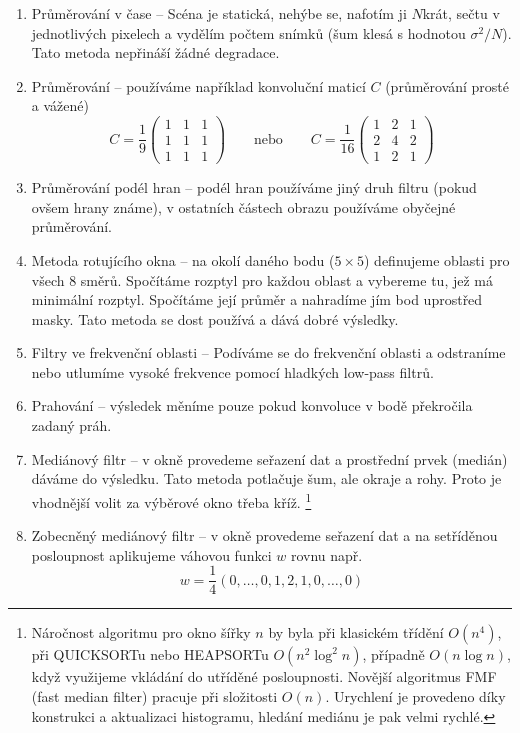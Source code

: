 \begin{enumerate}
\item Průměrování v čase -- Scéna je statická, nehýbe se, nafotím ji $ N $krát, sečtu v jednotlivých pixelech a vydělím počtem snímků (šum klesá s hodnotou $ \sigma^2/N $). Tato metoda nepřináší žádné degradace.
\item Průměrování -- používáme například konvoluční maticí $C$ (průměrování prosté a vážené)
\begin{equation}
C = \frac{1}{9}\left(\begin{array}{ccc}1&1&1\\1&1&1\\1&1&1\end{array}\right)
\qquad
\text{nebo}
\qquad
C = \frac{1}{16}\left(\begin{array}{ccc}1&2&1\\2&4&2\\1&2&1\end{array}\right)
\end{equation}

\item Průměrování podél hran -- podél hran používáme jiný druh filtru (pokud ovšem hrany známe), 
v ostatních částech obrazu používáme obyčejné průměrování.

\item Metoda rotujícího okna -- na okolí daného bodu ($ 5 \times 5 $) definujeme oblasti pro všech 8 směrů. 
Spočítáme rozptyl pro každou oblast a vybereme tu, jež má minimální rozptyl. Spočítáme její průměr a nahradíme jím bod uprostřed masky. Tato metoda se dost používá a dává dobré výsledky. %


\item Filtry ve frekvenční oblasti -- Podíváme se do frekvenční oblasti a odstraníme nebo utlumíme vysoké frekvence pomocí hladkých low-pass filtrů.

\item Prahování -- výsledek měníme pouze pokud konvoluce v bodě překročila zadaný práh. 

\item Mediánový filtr -- v okně provedeme seřazení dat a prostřední prvek (medián) dáváme do výsledku. Tato metoda potlačuje šum, ale  okraje a rohy. Proto je vhodnější volit za výběrové okno třeba kříž. \footnote{
Náročnost algoritmu pro okno šířky $n$ by byla při klasickém třídění $O(n^4)$, při QUICKSORTu nebo HEAPSORTu $O(n^2\log^2 n)$, případně
$O(n\log n)$, když využijeme vkládání do utříděné posloupnosti. Novější algoritmus FMF (fast median filter) pracuje při
složitosti $O(n)$. Urychlení je provedeno díky konstrukci a aktualizaci histogramu, hledání mediánu je pak velmi rychlé.}

\item Zobecněný mediánový filtr -- v okně provedeme seřazení dat a na setříděnou posloupnost aplikujeme váhovou funkci $w$
 rovnu např. 
\begin{equation}
w=\frac{1}{4}(0,\dots,0,1,2,1,0,\dots,0)
\end{equation}
\end{enumerate}

